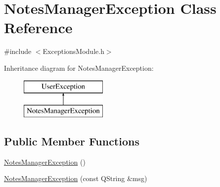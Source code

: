 \hypertarget{class_notes_manager_exception}{\section{Notes\-Manager\-Exception Class Reference}
\label{class_notes_manager_exception}
}


{\ttfamily \#include $<$Exceptions\-Module.\-h$>$}

Inheritance diagram for Notes\-Manager\-Exception\-:\begin{figure}[H]
\begin{center}
\leavevmode
\includegraphics[height=2.000000cm]{class_notes_manager_exception}
\end{center}
\end{figure}
\subsection*{Public Member Functions}
\begin{DoxyCompactItemize}
\item 
\hyperlink{class_notes_manager_exception_a777fa12942b90185ae336bc5247ea724}{Notes\-Manager\-Exception} ()
\item 
\hyperlink{class_notes_manager_exception_a14129f442d8f90c76cd4da2d680c9ffe}{Notes\-Manager\-Exception} (const Q\-String \&msg)
\end{DoxyCompactItemize}



